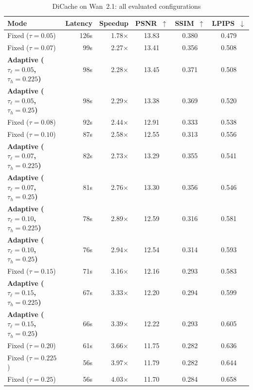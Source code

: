 \begin{table}[htbp]
\centering
\footnotesize
\setlength{\tabcolsep}{5pt}
\caption{DiCache on Wan~2.1: all evaluated configurations}
\label{tab:app-dc-wan}
\begin{tabular}{lrrccc}
\toprule
\textbf{Mode} & \textbf{Latency} & \textbf{Speedup} & \textbf{PSNR~$\uparrow$} & \textbf{SSIM~$\uparrow$} & \textbf{LPIPS~$\downarrow$} \\
\midrule
  Fixed ($\tau=0.05$) & 126s & 1.78$\times$ & 13.83 & 0.380 & 0.479 \\
  Fixed ($\tau=0.07$) & 99s & 2.27$\times$ & 13.41 & 0.356 & 0.508 \\
  \textbf{Adaptive ($\tau_\ell=0.05$, $\tau_h=0.225$)} & 98s & 2.28$\times$ & 13.45 & 0.371 & 0.508 \\
  \textbf{Adaptive ($\tau_\ell=0.05$, $\tau_h=0.25$)} & 98s & 2.29$\times$ & 13.38 & 0.369 & 0.520 \\
  Fixed ($\tau=0.08$) & 92s & 2.44$\times$ & 12.91 & 0.333 & 0.538 \\
  Fixed ($\tau=0.10$) & 87s & 2.58$\times$ & 12.55 & 0.313 & 0.556 \\
  \textbf{Adaptive ($\tau_\ell=0.07$, $\tau_h=0.225$)} & 82s & 2.73$\times$ & 13.29 & 0.355 & 0.541 \\
  \textbf{Adaptive ($\tau_\ell=0.07$, $\tau_h=0.25$)} & 81s & 2.76$\times$ & 13.30 & 0.356 & 0.546 \\
  \textbf{Adaptive ($\tau_\ell=0.10$, $\tau_h=0.225$)} & 78s & 2.89$\times$ & 12.59 & 0.316 & 0.581 \\
  \textbf{Adaptive ($\tau_\ell=0.10$, $\tau_h=0.25$)} & 76s & 2.94$\times$ & 12.54 & 0.314 & 0.593 \\
  Fixed ($\tau=0.15$) & 71s & 3.16$\times$ & 12.16 & 0.293 & 0.583 \\
  \textbf{Adaptive ($\tau_\ell=0.15$, $\tau_h=0.225$)} & 67s & 3.33$\times$ & 12.20 & 0.294 & 0.599 \\
  \textbf{Adaptive ($\tau_\ell=0.15$, $\tau_h=0.25$)} & 66s & 3.39$\times$ & 12.22 & 0.293 & 0.605 \\
  Fixed ($\tau=0.20$) & 61s & 3.66$\times$ & 11.75 & 0.282 & 0.636 \\
  Fixed ($\tau=0.225$) & 56s & 3.97$\times$ & 11.79 & 0.282 & 0.644 \\
  Fixed ($\tau=0.25$) & 56s & 4.03$\times$ & 11.70 & 0.284 & 0.658 \\
\bottomrule
\end{tabular}
\end{table}
